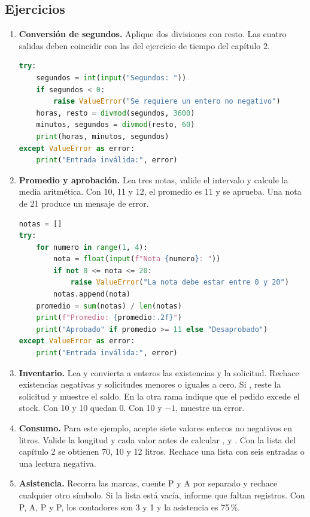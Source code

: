 \subsection{Ejercicios}

\begin{enumerate}
\item \textbf{Conversión de segundos.} Aplique dos divisiones con resto. Las cuatro salidas deben coincidir con las del ejercicio de tiempo del capítulo 2.
\begin{lstlisting}[style=libro,language=Python]
try:
    segundos = int(input("Segundos: "))
    if segundos < 0:
        raise ValueError("Se requiere un entero no negativo")
    horas, resto = divmod(segundos, 3600)
    minutos, segundos = divmod(resto, 60)
    print(horas, minutos, segundos)
except ValueError as error:
    print("Entrada inválida:", error)
\end{lstlisting}
\item \textbf{Promedio y aprobación.} Lea tres notas, valide el intervalo y calcule la media aritmética. Con 10, 11 y 12, el promedio es 11 y se aprueba. Una nota de 21 produce un mensaje de error.
\begin{lstlisting}[style=libro,language=Python]
notas = []
try:
    for numero in range(1, 4):
        nota = float(input(f"Nota {numero}: "))
        if not 0 <= nota <= 20:
            raise ValueError("La nota debe estar entre 0 y 20")
        notas.append(nota)
    promedio = sum(notas) / len(notas)
    print(f"Promedio: {promedio:.2f}")
    print("Aprobado" if promedio >= 11 else "Desaprobado")
except ValueError as error:
    print("Entrada inválida:", error)
\end{lstlisting}
\item \textbf{Inventario.} Lea y convierta a enteros las existencias y la solicitud. Rechace existencias negativas y solicitudes menores o iguales a cero. Si , reste la solicitud y muestre el saldo. En la otra rama indique que el pedido excede el stock. Con 10 y 10 quedan 0. Con 10 y \(-1\), muestre un error.
\item \textbf{Consumo.} Para este ejemplo, acepte siete valores enteros no negativos en litros. Valide la longitud y cada valor antes de calcular ,  y . Con la lista del capítulo 2 se obtienen 70, 10 y 12 litros. Rechace una lista con seis entradas o una lectura negativa.
\item \textbf{Asistencia.} Recorra las marcas, cuente P y A por separado y rechace cualquier otro símbolo. Si la lista está vacía, informe que faltan registros. Con P, A, P y P, los contadores son 3 y 1 y la asistencia es 75\,\%.

\end{enumerate}
